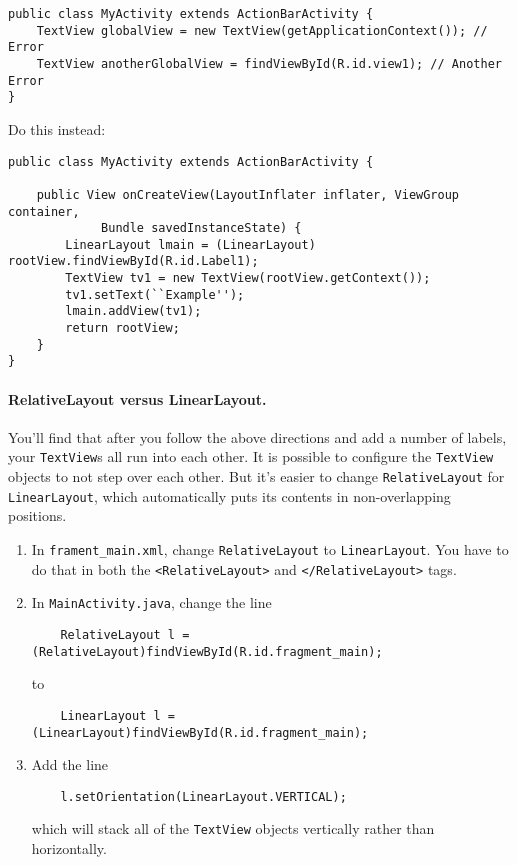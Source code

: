 \documentclass[10pt]{article}
\begin{document}
\begin{verbatim}
public class MyActivity extends ActionBarActivity {
    TextView globalView = new TextView(getApplicationContext()); // Error
    TextView anotherGlobalView = findViewById(R.id.view1); // Another Error
}
\end{verbatim} \vspace*{-1em}

Do this instead:
\begin{verbatim}
public class MyActivity extends ActionBarActivity {
	
    public View onCreateView(LayoutInflater inflater, ViewGroup container,
             Bundle savedInstanceState) {
        LinearLayout lmain = (LinearLayout) rootView.findViewById(R.id.Label1);
        TextView tv1 = new TextView(rootView.getContext());
        tv1.setText(``Example'');
        lmain.addView(tv1);
        return rootView;
    }
}
\end{verbatim} \vspace*{-1em}

\paragraph{RelativeLayout versus LinearLayout.} You'll find
that after you follow the above directions and add a number of labels, your {\tt TextView}s all run into each other. It is possible to configure the {\tt TextView} objects to not step over each other. But it's easier to change {\tt RelativeLayout} for {\tt LinearLayout}, which automatically puts its contents in non-overlapping positions.

\begin{enumerate}
\item In {\tt frament\_main.xml}, change {\tt RelativeLayout} to {\tt LinearLayout}. You have to do that in both the \verb+<RelativeLayout>+ and \verb+</RelativeLayout>+ tags.
\item In {\tt MainActivity.java}, change the line  \vspace*{-1em}
\begin{verbatim}
    RelativeLayout l = (RelativeLayout)findViewById(R.id.fragment_main);
\end{verbatim} \vspace*{-1em}
to
 \vspace*{-1em} \begin{verbatim}
    LinearLayout l = (LinearLayout)findViewById(R.id.fragment_main);
\end{verbatim}
\item Add the line  \vspace*{-1em}
\begin{verbatim}
    l.setOrientation(LinearLayout.VERTICAL);
\end{verbatim}  \vspace*{-1em}
which will stack all of the {\tt TextView} objects vertically rather than horizontally.
\end{enumerate}
\end{document}
